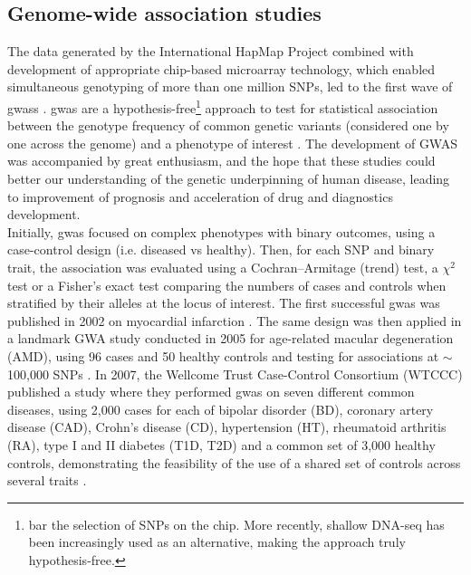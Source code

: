 
\newpage

\subsection{Genome-wide association studies}
\label{sec:gwas}

The data generated by the International HapMap Project combined with development of appropriate chip-based microarray technology, which enabled simultaneous genotyping of more than one million SNPs, led to the first wave of \glspl{gwas} \cite{visscher2012five}.
\gls{gwas} are a hypothesis-free\footnote{bar the selection of SNPs on the chip. 
More recently, shallow DNA-seq has been increasingly used as an alternative, making the approach truly hypothesis-free.} approach to test for statistical association between the genotype frequency of common genetic variants (considered one by one across the genome) and a phenotype of interest \cite{mccarthy2008genome}. 
The development of GWAS was accompanied by great enthusiasm, and the hope that these studies could better our understanding of the genetic underpinning of human disease, leading to improvement of prognosis and acceleration of drug and diagnostics development.
\\

Initially, \gls{gwas} focused on complex phenotypes with binary outcomes, using a case-control design (i.e. diseased vs healthy).
Then, for each SNP and binary trait, the association was evaluated using a Cochran–Armitage (trend) test, a $\chi^2$ test or a Fisher's exact test comparing the numbers of cases and controls when stratified by their alleles at the locus of interest. 
The first successful \gls{gwas} was published in 2002 on myocardial infarction \cite{ozaki2002functional}.
The same design was then applied in a landmark GWA study conducted in 2005 for age-related macular degeneration (AMD), using 96 cases and 50 healthy controls and testing for associations at $\sim$100,000 SNPs \cite{klein2005complement}. 
In 2007, the Wellcome Trust Case-Control Consortium (WTCCC) published a study where they performed \gls{gwas} on seven different common diseases, using 2,000 cases for each of bipolar disorder (BD), coronary artery disease (CAD), Crohn's disease (CD), hypertension (HT), rheumatoid arthritis (RA), type I and II diabetes (T1D, T2D) and a common set of 3,000 healthy controls, demonstrating the feasibility of the use of a shared set of controls across several traits \cite{wellcome2007genome}.\\

